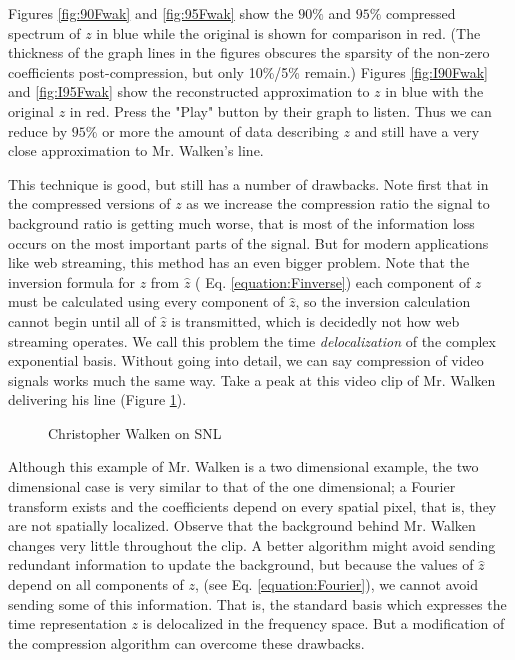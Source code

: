 \documentclass{report}
\begin{document}
Figures \ref{fig:90Fwak} and \ref{fig:95Fwak} show the $90\%$ and $95\%$ compressed spectrum of $z$ in blue while the original is shown for comparison in red. (The thickness of the graph lines in the figures obscures the sparsity of the non-zero coefficients post-compression, but only 10\%/5\% remain.) Figures \ref{fig:I90Fwak} and \ref{fig:I95Fwak} show the reconstructed approximation to $z$ in blue with the original $z$ in red. Press the "Play" button by their graph to listen. Thus we can reduce by $95\%$ or more the amount of data describing  $z$ and still have a very close approximation to Mr. Walken's line.

This technique is good, but still has a number of drawbacks. Note first that in the compressed versions of $z$ as we increase the compression ratio the signal to background ratio is getting much worse, that is most of the information loss occurs on the most important parts of the signal. But for modern applications like web streaming, this method has an even bigger problem. Note that the inversion formula for $z$ from $\hat z$ ( Eq. \ref{equation:Finverse}) each component of $z$ must be calculated using every component of $\hat z$, so the inversion calculation cannot begin until all of $\hat z$ is transmitted, which is decidedly not how web streaming operates. We call this problem the time \emph{delocalization} of the complex exponential basis. Without going into detail, we can say compression of video signals works much the same way. Take a peak at this video clip of Mr. Walken delivering his line (Figure \ref{fig:wakclip}).

\begin{figure}[!hb]
\center
\caption{Christopher Walken on SNL}
\label{fig:wakclip}
\end{figure}

Although this example of Mr. Walken is a two dimensional example, the two dimensional case is very similar to that of the one dimensional; a Fourier transform exists and the coefficients depend on every spatial pixel, that is, they are not spatially localized. Observe that the background behind Mr. Walken changes very little throughout the clip. A better algorithm might avoid sending redundant information to update the background, but because the values of $\hat z$ depend on all components of $z$, (see Eq. \ref{equation:Fourier}), we cannot avoid sending some of this information.  That is, the standard basis which expresses the time representation $z$ is delocalized in the frequency space. But a modification of the compression algorithm can overcome these drawbacks.
\end{document}
